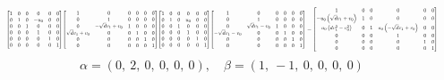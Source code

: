\documentclass[11pt]{article}
\theoremstyle{definition}
\begin{document}
\[
\scaletoalign{\textwidth}{{\left[\begin{matrix}1 & 0 & 0 & 0 & 0 & 0\\0 & 1 & 0 & - u_{0} & 0 & 0\\0 & 0 & 1 & 0 & 0 & 0\\0 & 0 & 0 & 1 & 0 & 0\\0 & 0 & 0 & 0 & 1 & 0\\0 & 0 & 0 & 0 & 0 & 1\end{matrix}\right]} {\left[\begin{matrix}1 & 0 & 0 & 0 & 0 & 0\\0 & 1 & 0 & 0 & 0 & 0\\0 & - \sqrt{d} v_{1} + v_{0} & 1 & 0 & 0 & 0\\\sqrt{d} v_{1} + v_{0} & 0 & 0 & 1 & 0 & 0\\0 & 0 & 0 & 0 & 1 & 0\\0 & 0 & 0 & 0 & 0 & 1\end{matrix}\right]} {\left[\begin{matrix}1 & 0 & 0 & 0 & 0 & 0\\0 & 1 & 0 & u_{0} & 0 & 0\\0 & 0 & 1 & 0 & 0 & 0\\0 & 0 & 0 & 1 & 0 & 0\\0 & 0 & 0 & 0 & 1 & 0\\0 & 0 & 0 & 0 & 0 & 1\end{matrix}\right]} {\left[\begin{matrix}1 & 0 & 0 & 0 & 0 & 0\\0 & 1 & 0 & 0 & 0 & 0\\0 & \sqrt{d} v_{1} - v_{0} & 1 & 0 & 0 & 0\\- \sqrt{d} v_{1} - v_{0} & 0 & 0 & 1 & 0 & 0\\0 & 0 & 0 & 0 & 1 & 0\\0 & 0 & 0 & 0 & 0 & 1\end{matrix}\right]} = {\left[\begin{matrix}1 & 0 & 0 & 0 & 0 & 0\\- u_{0} \left(\sqrt{d} v_{1} + v_{0}\right) & 1 & 0 & 0 & 0 & 0\\u_{0} \left(d v_{1}^{2} - v_{0}^{2}\right) & 0 & 1 & u_{0} \left(- \sqrt{d} v_{1} + v_{0}\right) & 0 & 0\\0 & 0 & 0 & 1 & 0 & 0\\0 & 0 & 0 & 0 & 1 & 0\\0 & 0 & 0 & 0 & 0 & 1\end{matrix}\right]}}
\]
\[
\alpha = \left( 0, \  2, \  0, \  0, \  0, \  0\right), \quad \beta = \left( 1, \  -1, \  0, \  0, \  0, \  0\right)
\]
\end{document}
